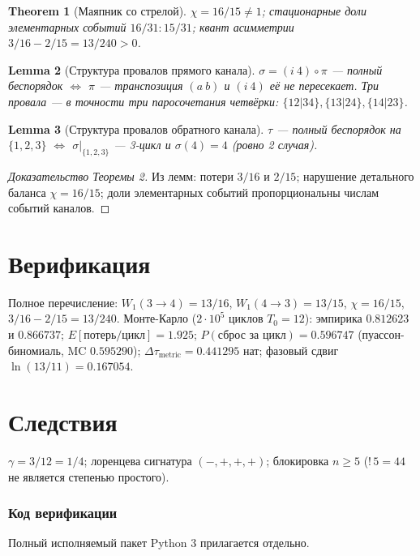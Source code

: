 \documentclass[11pt,a4paper]{article}
\newtheorem{theorem}{Theorem}[section]
\newtheorem{lemma}[theorem]{Lemma}
\newcommand{\subfact}{\mathord{!}\,}
\begin{document}
\begin{theorem}[Маяпник со стрелой]
$\chi = 16/15 \neq 1$; стационарные доли элементарных событий $16/31 : 15/31$;
квант асимметрии $3/16 - 2/15 = 13/240 > 0$.
\end{theorem}

\begin{lemma}[Структура провалов прямого канала]
$\sigma = (i\ 4)\circ\pi$ — полный беспорядок $\iff$ $\pi$ — транспозиция $(a\ b)$
и $(i\ 4)$ её не пересекает. Три провала — в точности три паросочетания
четвёрки: $\{12|34\}, \{13|24\}, \{14|23\}$.
\end{lemma}

\begin{lemma}[Структура провалов обратного канала]
$\tau$ — полный беспорядок на $\{1,2,3\}$ $\iff$ $\sigma|_{\{1,2,3\}}$ — 3-цикл
и $\sigma(4) = 4$ (ровно 2 случая).
\end{lemma}

\begin{proof}[Доказательство Теоремы 2]
Из лемм: потери $3/16$ и $2/15$; нарушение детального баланса
$\chi = 16/15$; доли элементарных событий пропорциональны числам событий каналов.
\end{proof}

\part{Верификация}
Полное перечисление: $W_1(3\to4)=13/16$, $W_1(4\to3)=13/15$, $\chi=16/15$,
$3/16-2/15=13/240$. Монте-Карло ($2\cdot10^5$ циклов $T_0=12$): эмпирика
$0.812623$ и $0.866737$; $E[\text{потерь/цикл}] = 1.925$;
$P(\text{сброс за цикл}) = 0.596747$ (пуассон-биномиаль, MC $0.595290$);
$\Delta\tau_{\text{metric}} = 0.441295$ нат; фазовый сдвиг $\ln(13/11) = 0.167054$.

\part{Следствия}
$\gamma = 3/12 = 1/4$; лоренцева сигнатура $(-,+,+,+)$; блокировка $n \ge 5$
($\subfact{5} = 44$ не является степенью простого).

\appendix
\section{Код верификации}
Полный исполняемый пакет Python 3 прилагается отдельно.
\end{document}
